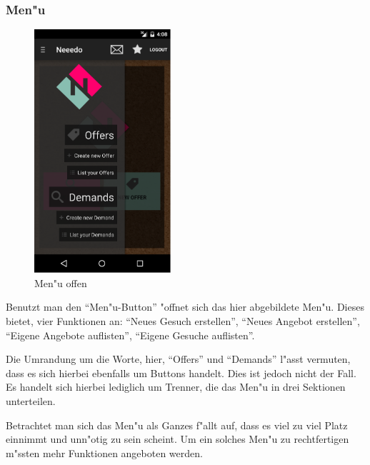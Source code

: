 \subsubsection{Men"u}
\begin{figure}[H]
\begin{center}
\includegraphics[width=0.45\textwidth]{./Bilder/menu.png}
\caption{Men"u offen}
\label{fig:menu}
\end{center}
\end{figure}

Benutzt man den \enquote{Men"u-Button} "offnet sich das hier abgebildete Men"u.
Dieses bietet, vier Funktionen an: \enquote{Neues Gesuch erstellen}, \enquote{Neues Angebot erstellen}, \enquote{Eigene Angebote auflisten}, \enquote{Eigene Gesuche auflisten}.

Die Umrandung um die Worte, hier, \enquote{Offers} und \enquote{Demands} l"asst vermuten, dass es sich hierbei ebenfalls um Buttons handelt. 
Dies ist jedoch nicht der Fall. 
Es handelt sich hierbei lediglich um Trenner, die das Men"u in drei Sektionen unterteilen.

Betrachtet man sich das Men"u als Ganzes f"allt auf, dass es viel zu viel Platz einnimmt und unn"otig zu sein scheint. 
Um ein solches Men"u zu rechtfertigen m"ssten mehr Funktionen angeboten werden. 


